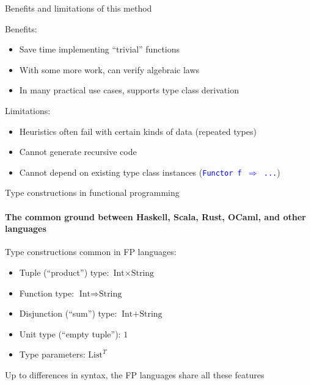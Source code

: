 \documentclass[english]{beamer}
\begin{document}
\begin{frame}{Benefits and limitations of this method}

Benefits:
\begin{itemize}
\item Save time implementing ``trivial'' functions
\item With some more work, can verify algebraic laws
\item In many practical use cases, supports type class derivation
\end{itemize}
Limitations:
\begin{itemize}
\item Heuristics often fail with certain kinds of data (repeated types)
\item Cannot generate recursive code
\item Cannot depend on existing type class instances (\texttt{\textcolor{blue}{\footnotesize{}Functor
f $\Rightarrow$ ...}})
\end{itemize}
\end{frame}

\begin{frame}{Type constructions in functional programming}


\framesubtitle{The common ground between Haskell, Scala, Rust, OCaml, and other
languages}

Type constructions common in FP languages:
\begin{itemize}
\item Tuple (``product'') type: $\text{Int}\times\text{String}$
\item Function type: $\text{Int}\Rightarrow\text{String}$
\item Disjunction (``sum'') type: $\text{Int}+\text{String}$
\item Unit type (``empty tuple''): $1$
\item Type parameters: $\text{List}^{T}$
\end{itemize}
Up to differences in syntax, the FP languages share all these features
\end{frame}
\end{document}
